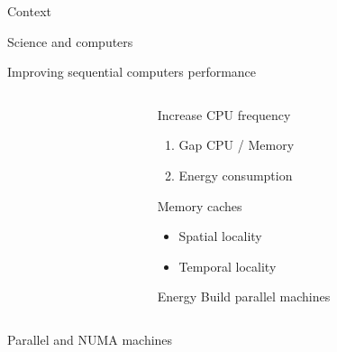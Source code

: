\documentclass[xcolor={usenames,dvipsnames},hyperref={pdfusetitle}]{beamer}
\begin{document}
\begin{section}{Context}

\begin{frame}{Science and computers}
    
\end{frame}

\begin{frame}{Improving sequential computers performance}
    \begin{columns}
        \begin{column}{.45\textwidth}
            \centering
            
            \begin{block}{}
            \end{block}
        \end{column}
        \begin{column}{.45\textwidth}
            \pause
            \begin{block}{Increase CPU frequency}
                \begin{enumerate}
                    \item Gap CPU / Memory
                    \item Energy consumption
                \end{enumerate}
            \end{block}
            \pause
            \begin{exampleblock}{Memory caches}
                \begin{itemize}
                    \item Spatial locality
                    \item Temporal locality
                \end{itemize}
            \end{exampleblock}
            \pause
            \begin{exampleblock}{Energy}
                Build parallel machines
            \end{exampleblock}
        \end{column}
    \end{columns}
\end{frame}

\begin{frame}{Parallel and NUMA machines}
    \begin{columns}
        \begin{column}{.2\linewidth}
            \begin{block}{}
            \end{block}
        \end{column}
        \begin{column}{.8\linewidth}
            \resizebox{!}{.75\textheight}{
                \centering
                
            }
        \end{column}
    \end{columns}
\end{frame}


\end{section}
\end{document}
